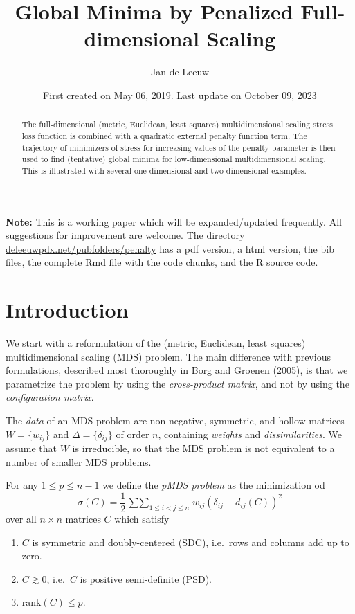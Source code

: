\documentclass[
  12pt,
]{article}
\title{Global Minima by Penalized Full-dimensional Scaling}
\author{Jan de Leeuw}
\date{First created on May 06, 2019. Last update on October 09, 2023}
\providecommand{\tightlist}{%
  \setlength{\itemsep}{0pt}\setlength{\parskip}{0pt}}
\begin{document}
\maketitle
\begin{abstract}
The full-dimensional (metric, Euclidean, least squares) multidimensional
scaling stress loss function is combined with a quadratic external
penalty function term. The trajectory of minimizers of stress for
increasing values of the penalty parameter is then used to find
(tentative) global minima for low-dimensional multidimensional scaling.
This is illustrated with several one-dimensional and two-dimensional
examples.
\end{abstract}

{
\setcounter{tocdepth}{3}
\tableofcontents
}
\textbf{Note:} This is a working paper which will be expanded/updated
frequently. All suggestions for improvement are welcome. The directory
\href{http://deleeuwpdx.net/pubfolders/penalty}{deleeuwpdx.net/pubfolders/penalty}
has a pdf version, a html version, the bib files, the complete Rmd file
with the code chunks, and the R source code.

\section{Introduction}\label{introduction}

We start with a reformulation of the (metric, Euclidean, least squares)
multidimensional scaling (MDS) problem. The main difference with
previous formulations, described most thoroughly in Borg and Groenen
(2005), is that we parametrize the problem by using the
\emph{cross-product matrix}, and not by using the \emph{configuration
matrix}.

The \emph{data} of an MDS problem are non-negative, symmetric, and
hollow matrices \(W=\{w_{ij}\}\) and \(\Delta=\{\delta_{ij}\}\) of order
\(n\), containing \emph{weights} and \emph{dissimilarities}. We assume
that \(W\) is irreducible, so that the MDS problem is not equivalent to
a number of smaller MDS problems.

For any \(1\leq p\leq n-1\) we define the \emph{pMDS problem} as the
minimization od \begin{equation}\label{E:stress}
\sigma(C)=\frac12\mathop{\sum\sum}_{1\leq i<j\leq n}w_{ij}(\delta_{ij}-d_{ij}(C))^2
\end{equation} over all \(n\times n\) matrices \(C\) which satisfy

\begin{enumerate}
\def\labelenumi{\arabic{enumi}.}
\tightlist
\item
  \(C\) is symmetric and doubly-centered (SDC), i.e.~rows and columns
  add up to zero.
\item
  \(C\gtrsim 0\), i.e.~\(C\) is positive semi-definite (PSD).
\item
  \(\text{rank}(C)\leq p\).
\end{enumerate}
\end{document}
